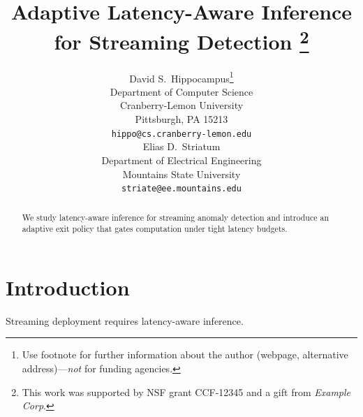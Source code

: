 \documentclass{article}
\title{Adaptive \textbf{Latency-Aware} Inference for {Streaming} Detection%
  \thanks{This work was supported by NSF grant CCF-12345 and a gift from \emph{Example Corp}.}}
\author{%
  David S.~Hippocampus\thanks{Use footnote for further information about the
  author (webpage, alternative address)---\emph{not} for funding agencies.} \\
  Department of Computer Science \\
  Cranberry-Lemon University \\
  Pittsburgh, PA 15213 \\
  \texttt{hippo@cs.cranberry-lemon.edu} \\
  \And
  Elias D.~Striatum \\
  Department of Electrical Engineering \\
  Mountains State University \\
  \texttt{striate@ee.mountains.edu} \\
}
\begin{document}
\maketitle

\begin{abstract}
We study latency-aware inference for streaming anomaly detection and introduce
an adaptive exit policy that gates computation under tight latency budgets.
\end{abstract}

\section{Introduction}
Streaming deployment requires latency-aware inference.
\end{document}
